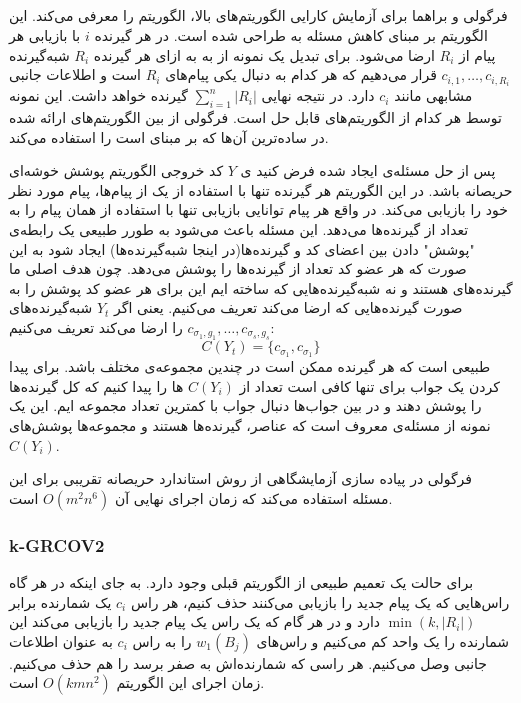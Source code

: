  \subsection{}
 فرگولی و براهما برای آزمایش کارایی الگوریتم‌های بالا، الگوریتم
 را معرفی می‌کند. این الگوریتم بر مبنای کاهش مسئله به
 \icod
 طراحی شده است. در 
 \picod
 هر گیرنده 
 $i$
 با بازیابی هر پیام از
 $R_i$
 ارضا می‌شود. برای تبدیل یک نمونه از
 \picod
 به
 \icod
 به ازای هر گیرنده
 $R_i$
 شبه‌گیرنده 
 $c_{i, 1}, \ldots, c_{i, {R_i}}$
 قرار می‌دهیم که هر کدام به دنبال یکی پیام‌های
 $R_i$
 است و اطلاعات جانبی مشابهی مانند
 $c_i$
 دارد. در نتیجه 
 \icod
 نهایی 
 $\sum\limits_{i = 1}^{n} |R_i|$
 گیرنده خواهد داشت. این نمونه توسط هر کدام از الگوریتم‌های
 \icod
 قابل حل است. فرگولی از بین الگوریتم‌های ارائه شده در
 \cite{25}
 ساده‌ترین آن‌ها که بر مبنای
 است را استفاده می‌کند.
 
 پس از حل مسئله‌ی
 \icod
 ایجاد شده فرض کنید ی
 $Y$
 کد خروجی الگوریتم پوشش خوشه‌ای حریصانه باشد. در این الگوریتم هر گیرنده تنها با استفاده از یک از پیام‌ها، پیام مورد نظر خود را بازیابی می‌کند. در واقع هر پیام توانایی بازیابی تنها با استفاده از همان پیام را به تعداد از گیرنده‌ها می‌دهد. این مسئله باعث می‌شود به طورر طبیعی یک رابطه‌ی "پوشش" دادن بین اعضای کد و گیرنده‌ها(در اینجا شبه‌گیرنده‌ها) ایجاد شود به این صورت که هر عضو کد تعداد از گیرنده‌ها را پوشش می‌دهد. چون هدف اصلی ما گیرنده‌های
 \picod
 هستند و نه شبه‌گیرنده‌هایی که ساخته ایم این برای هر عضو کد پوشش را به صورت گیرنده‌هایی که ارضا می‌کند تعریف می‌کنیم. یعنی اگر
 $Y_t$
 شبه‌گیرنده‌های
 $c_{\sigma_1, g_1}, \ldots, c_{\sigma_s, g_s}$
 را ارضا می‌کند تعریف می‌کنیم:
 $$C(Y_t) =\{ c_{\sigma_1}, c_{\sigma_1}\}$$
 طبیعی است که هر گیرنده ممکن است در چندین مجموعه‌ی مختلف باشد. برای پیدا کردن یک جواب برای
 \picod
 تنها کافی است تعداد از 
 $C(Y_i)$
 ها را پیدا کنیم که کل گیرنده‌ها را پوشش دهند و در بین جواب‌ها دنبال جواب با کمترین تعداد مجموعه‌ ایم. این یک نمونه از مسئله‌ی معروف
 است که عناصر، گیرنده‌ها هستند و مجموعه‌ها پوشش‌های
 $C(Y_i)$.
 
 فرگولی در پیاده سازی آزمایشگاهی از روش استاندارد حریصانه تقریبی برای این مسئله استفاده می‌کند که زمان اجرای نهایی آن
 $O(m^2 n^6)$
 است.
\subsubsection{k-GRCOV2}
برای حالت
\picodt
یک تعمیم طبیعی از الگوریتم قبلی وجود دارد. به جای اینکه در هر گاه راس‌هایی که یک پیام جدید را بازیابی می‌کنند حذف کنیم، هر راس 
$c_i$
یک شمارنده برابر
$\min(k, |R_i|)$
دارد و در هر گام که یک راس یک پیام جدید را بازیابی می‌کند این شمارنده را یک واحد کم می‌کنیم و راس‌های
$w_1(B_j)$
را به راس
$c_i$
به عنوان اطلاعات جانبی وصل می‌کنیم. هر راسی که شمارنده‌اش به صفر برسد را هم حذف می‌کنیم. زمان اجرای این الگوریتم
$O(kmn^2)$
است.

